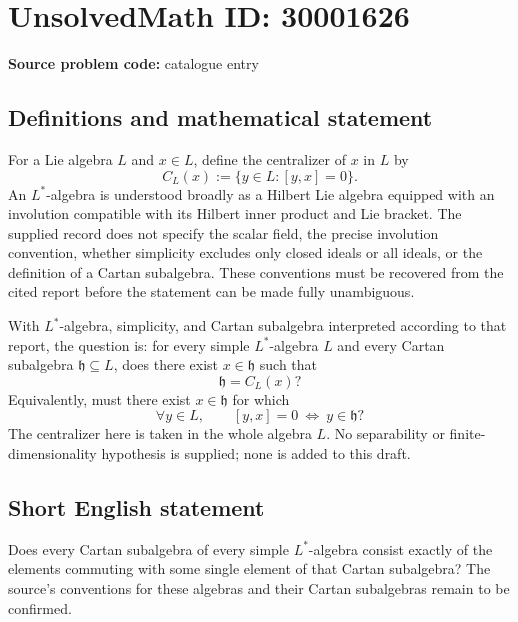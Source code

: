 \documentclass[11pt]{article}
\begin{document}
\section*{UnsolvedMath ID: 30001626}
\textbf{Source problem code:} catalogue entry
\subsection{Definitions and mathematical statement}
For a Lie algebra \(L\) and \(x\in L\), define the centralizer of \(x\) in \(L\) by
\[
C_L(x):=\{y\in L:[y,x]=0\}.
\]
An \(L^*\)-algebra is understood broadly as a Hilbert Lie algebra equipped with an involution compatible with its Hilbert inner product and Lie bracket. The supplied record does not specify the scalar field, the precise involution convention, whether simplicity excludes only closed ideals or all ideals, or the definition of a Cartan subalgebra. These conventions must be recovered from the cited report before the statement can be made fully unambiguous.

With \(L^*\)-algebra, simplicity, and Cartan subalgebra interpreted according to that report, the question is: for every simple \(L^*\)-algebra \(L\) and every Cartan subalgebra \(\mathfrak h\subseteq L\), does there exist \(x\in\mathfrak h\) such that
\[
\mathfrak h=C_L(x)?
\]
Equivalently, must there exist \(x\in\mathfrak h\) for which
\[
\forall y\in L,\qquad [y,x]=0\ \Longleftrightarrow\ y\in\mathfrak h?
\]
The centralizer here is taken in the whole algebra \(L\). No separability or finite-dimensionality hypothesis is supplied; none is added to this draft.
\subsection{Short English statement}
Does every Cartan subalgebra of every simple \(L^*\)-algebra consist exactly of the elements commuting with some single element of that Cartan subalgebra? The source's conventions for these algebras and their Cartan subalgebras remain to be confirmed.
\end{document}
